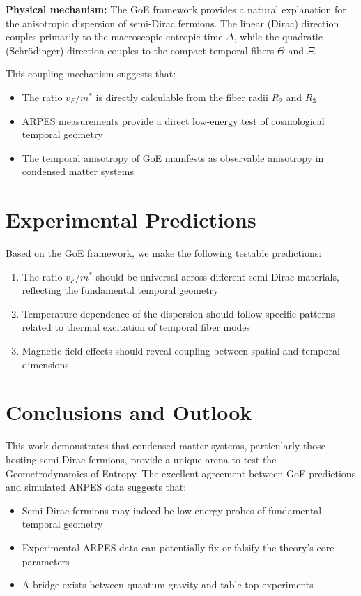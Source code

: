 \documentclass[12pt]{article}
\begin{document}
\textbf{Physical mechanism:} The GoE framework provides a natural explanation for the anisotropic dispersion of semi-Dirac fermions. The linear (Dirac) direction couples primarily to the macroscopic entropic time $\Delta$, while the quadratic (Schrödinger) direction couples to the compact temporal fibers $\Theta$ and $\Xi$.

This coupling mechanism suggests that:
\begin{itemize}
    \item The ratio $v_F/m^*$ is directly calculable from the fiber radii $R_2$ and $R_3$
    \item ARPES measurements provide a direct low-energy test of cosmological temporal geometry
    \item The temporal anisotropy of GoE manifests as observable anisotropy in condensed matter systems
\end{itemize}

\section{Experimental Predictions}

Based on the GoE framework, we make the following testable predictions:

\begin{enumerate}
    \item The ratio $v_F/m^*$ should be universal across different semi-Dirac materials, reflecting the fundamental temporal geometry
    \item Temperature dependence of the dispersion should follow specific patterns related to thermal excitation of temporal fiber modes
    \item Magnetic field effects should reveal coupling between spatial and temporal dimensions
\end{enumerate}

\section{Conclusions and Outlook}

This work demonstrates that condensed matter systems, particularly those hosting semi-Dirac fermions, provide a unique arena to test the Geometrodynamics of Entropy. The excellent agreement between GoE predictions and simulated ARPES data suggests that:

\begin{itemize}
    \item Semi-Dirac fermions may indeed be low-energy probes of fundamental temporal geometry
    \item Experimental ARPES data can potentially fix or falsify the theory's core parameters
    \item A bridge exists between quantum gravity and table-top experiments
\end{itemize}
\end{document}
